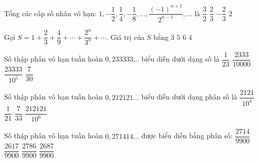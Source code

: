 \begin{ex}%
	Tổng các cấp số nhân vô hạn: $1,-\dfrac{1}{2},\dfrac{1}{4},-\dfrac{1}{8},\ldots,\dfrac{(-1)^{n+1}}{2^{n-1}},\ldots$ là
	\choice
	{$\dfrac{3}{2}$}
	{\True $\dfrac{2}{3}$}
	{$-\dfrac{2}{3}$}
	{$2$}
\end{ex}
\begin{ex}%
	Gọi $S=1+\dfrac{2}{3}+\dfrac{4}{9}+\cdots +\dfrac{2^n}{3^n}+\cdots$. Giá trị của $S$ bằng
	\choice
	{\True $3$}
	{$5$}
	{$6$}
	{$4$}
\end{ex}
\begin{ex}%
	Số thập phân vô hạn tuần hoàn $0{,}233333\ldots$ biểu diễn dưới dạng số là 
	\choice
	{$\dfrac{1}{23}$}
	{$\dfrac{2333}{10000}$}
	{$\dfrac{23333}{10^5}$}
	{\True $\dfrac{7}{30}$}
\end{ex}
\begin{ex}%
	Số thập phân vô hạn tuần hoàn $0{,}212121\ldots$ biểu diễn dưới dạng phân số là 
	\choice
	{$\dfrac{2121}{10^4}$}
	{$\dfrac{1}{21}$}
	{\True $\dfrac{7}{33}$}
	{$\dfrac{212121}{10^6}$}
\end{ex}

\begin{ex}%
	Số thập phân vô hạn tuần hoàn $0{,}271414\ldots$ được biểu diễn bằng phân số: 
	\choice
	{$\dfrac{2714}{9900}$}
	{$\dfrac{2617}{9900}$}
	{$\dfrac{2786}{9900}$}
	{\True $\dfrac{2687}{9900}$}
\end{ex}

